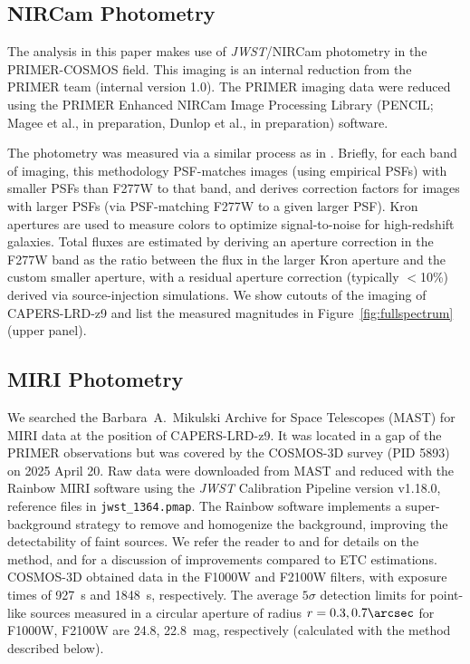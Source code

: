 \documentclass[twocolumn]{aastex7}
\newcommand{\src}{CAPERS-LRD-z9}
\begin{document}
\subsection{NIRCam Photometry}\label{sec:nircam}

The analysis in this paper makes use of \textit{JWST}/NIRCam photometry in the PRIMER-COSMOS field. This imaging is an internal reduction from the PRIMER team (internal version 1.0). The PRIMER imaging data were reduced using the PRIMER Enhanced NIRCam Image Processing Library (PENCIL; Magee et al., in preparation, Dunlop et al., in preparation) software. 

The photometry was measured via a similar process as in \cite{finkelstein24}.  Briefly, for each band of imaging, this methodology PSF-matches images (using empirical PSFs) with smaller PSFs than F277W to that band, and derives correction factors for images with larger PSFs (via PSF-matching F277W to a given larger PSF).  Kron apertures are used to measure colors to optimize signal-to-noise for high-redshift galaxies.  Total fluxes are estimated by deriving an aperture correction in the F277W band as the ratio between the flux in the larger Kron aperture and the custom smaller aperture, with a residual aperture correction (typically $<$10\%) derived via source-injection simulations. We show cutouts of the imaging of \src{} and list the measured magnitudes in Figure~\ref{fig:fullspectrum} (upper panel).

\subsection{MIRI Photometry}\label{sec:miri}
We searched the Barbara~A.~Mikulski Archive for Space Telescopes (MAST) for MIRI data at the position of \src{}. It was located in a gap of the PRIMER observations but was covered by the COSMOS-3D survey (PID 5893) on 2025 April 20. Raw data were downloaded from MAST and reduced with the Rainbow MIRI software \citep{PerezGonzalez24} using the \textit{JWST} Calibration Pipeline version v1.18.0, reference files in \texttt{jwst\_1364.pmap}. The Rainbow software implements a super-background strategy to remove and homogenize the background, improving the detectability of faint sources. We refer the reader to \citet{PerezGonzalez24} and \citet{2025A&A...696A..57O} for details on the method, and for a discussion of improvements compared to ETC estimations. COSMOS-3D obtained data in the F1000W and F2100W filters, with exposure times of 927~s and 1848~s, respectively. The average $5\sigma$ detection limits for point-like sources measured in a circular aperture of radius $r=0.3, 0.7\arcsec$ for F1000W, F2100W are 24.8, 22.8~mag, respectively (calculated with the method described below). 
\end{document}
